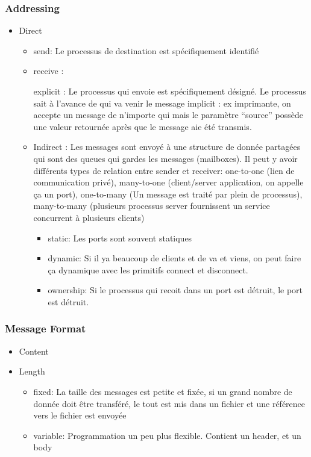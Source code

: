 \subsubsection{Addressing}
\begin{itemize}
  \item Direct
    \begin{itemize}
      \item send: Le processus de destination est spécifiquement identifié
      \item receive :

        explicit : Le processus qui envoie est spécifiquement désigné.
        Le processus sait à l'avance de qui va venir le message
        implicit : ex imprimante, on accepte un message de n'importe qui mais le paramètre ``source''
        possède une valeur retournée après que le message aie été transmis.
      \item Indirect : Les messages sont envoyé à une structure de donnée partagées qui sont des queues qui gardes les messages (mailboxes).
        Il peut y avoir différents types de relation entre sender et receiver:
        one-to-one (lien de communication privé),
        many-to-one (client/server application, on appelle ça un port),
        one-to-many (Un message est traité par plein de processus),
        many-to-many (plusieurs processus server fournissent un service concurrent à plusieurs clients)
        \begin{itemize}
          \item static: Les ports sont souvent statiques
          \item dynamic: Si il ya beaucoup de clients et de va et viens, on peut faire ça
            dynamique avec les primitifs connect et disconnect.
          \item ownership: Si le processus qui recoit dans un port est détruit, le port est détruit.
        \end{itemize}
    \end{itemize}
\end{itemize}

\subsubsection{Message Format}
\begin{itemize}
  \item Content
  \item Length
    \begin{itemize}
      \item fixed: La taille des messages est petite et fixée, si un grand nombre de donnée doit être transféré,
        le tout est mis dans un fichier et une référence vers le fichier est envoyée
      \item variable: Programmation un peu plus flexible.
        Contient un header, et un body
    \end{itemize}
\end{itemize}


